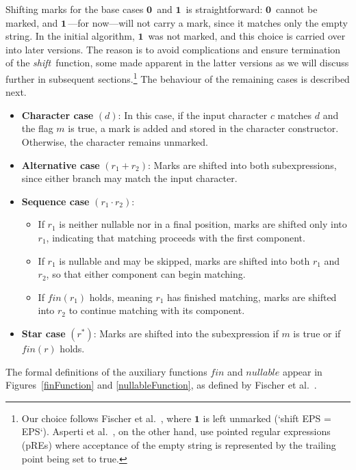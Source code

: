 \documentclass[12pt]{article}
\newcommand{\ZERO}{\textbf{0}}
\newcommand{\ONE}{\textbf{1}}
\newcommand{\shift}{\textit{shift}}
\newcommand{\fin}{\textit{fin}}
\newcommand{\nullable}{\textit{nullable}}
\begin{document}
\noindent
Shifting marks for the base cases $\ZERO\,$ and $\ONE\,$ is straightforward:  
$\ZERO\,$ cannot be marked, and $\ONE\,$---for now---will not carry a mark, 
since it matches only the empty string. In the initial algorithm, $\ONE\,$ was
 not marked, and this choice is carried over into later versions. The reason is 
 to avoid complications and ensure termination of the \shift\ function, some made 
 apparent in the latter versions as we will discuss further in subsequent sections.\footnote{Our choice follows Fischer et al.~\cite{Fischer2010}, where $\ONE$ is left 
 unmarked (`shift EPS = EPS`). Asperti et al.~\cite{Asperti2010}, on the other hand, 
 use pointed regular expressions (pREs) where acceptance of the empty string is represented
  by the trailing point being set to true.} The behaviour of the remaining cases is described next.

\begin{itemize}
  \item \textbf{Character case} $(d)$:  
  In this case, if the input character $c$ matches $d$ and the flag $m$ is true, a mark 
  is added and stored in the character constructor. Otherwise, the character remains unmarked.  

  \item \textbf{Alternative case} $(r_1 + r_2)$:  
  Marks are shifted into both subexpressions, since either branch may match the input character.  

  \item \textbf{Sequence case} $(r_1 \cdot r_2)$:  
  \begin{itemize}
    \item If $r_1$ is neither nullable nor in a final position, marks are shifted only into $r_1$,  
          indicating that matching proceeds with the first component. 

    \item If $r_1$ is nullable and may be skipped, marks are shifted into both $r_1$ and $r_2$,  
          so that either component can begin matching. 

    \item If $\fin(r_1)$ holds, meaning $r_1$ has finished matching, marks are shifted into $r_2$  
          to continue matching with its component.  
  \end{itemize}

  \item \textbf{Star case} $(r^*)$:  
  Marks are shifted into the subexpression if $m$ is true or if $\fin(r)$ holds.  
\end{itemize}
The formal definitions of the auxiliary functions $\fin$ and $\nullable$ appear 
in Figures~\ref{finFunction} and \ref{nullableFunction}, as defined by Fischer et al.~\cite{Fischer2010}.
\end{document}
